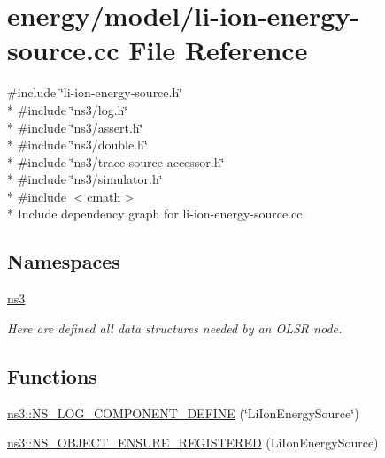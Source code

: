 \hypertarget{model_2li-ion-energy-source_8cc}{}\section{energy/model/li-\/ion-\/energy-\/source.cc File Reference}
\label{model_2li-ion-energy-source_8cc}
{\ttfamily \#include \char`\"{}li-\/ion-\/energy-\/source.\+h\char`\"{}}\\*
{\ttfamily \#include \char`\"{}ns3/log.\+h\char`\"{}}\\*
{\ttfamily \#include \char`\"{}ns3/assert.\+h\char`\"{}}\\*
{\ttfamily \#include \char`\"{}ns3/double.\+h\char`\"{}}\\*
{\ttfamily \#include \char`\"{}ns3/trace-\/source-\/accessor.\+h\char`\"{}}\\*
{\ttfamily \#include \char`\"{}ns3/simulator.\+h\char`\"{}}\\*
{\ttfamily \#include $<$cmath$>$}\\*
Include dependency graph for li-\/ion-\/energy-\/source.cc\+:
\subsection*{Namespaces}
\begin{DoxyCompactItemize}
\item 
 \hyperlink{namespacens3}{ns3}
\begin{DoxyCompactList}\small\item\em Here are defined all data structures needed by an O\+L\+SR node. \end{DoxyCompactList}\end{DoxyCompactItemize}
\subsection*{Functions}
\begin{DoxyCompactItemize}
\item 
\hyperlink{namespacens3_a724c176f4a992fedbb5ede85de2707cf}{ns3\+::\+N\+S\+\_\+\+L\+O\+G\+\_\+\+C\+O\+M\+P\+O\+N\+E\+N\+T\+\_\+\+D\+E\+F\+I\+NE} (\char`\"{}Li\+Ion\+Energy\+Source\char`\"{})
\item 
\hyperlink{namespacens3_a2c6683a6912501917bcb3bf008a79e96}{ns3\+::\+N\+S\+\_\+\+O\+B\+J\+E\+C\+T\+\_\+\+E\+N\+S\+U\+R\+E\+\_\+\+R\+E\+G\+I\+S\+T\+E\+R\+ED} (Li\+Ion\+Energy\+Source)
\end{DoxyCompactItemize}
